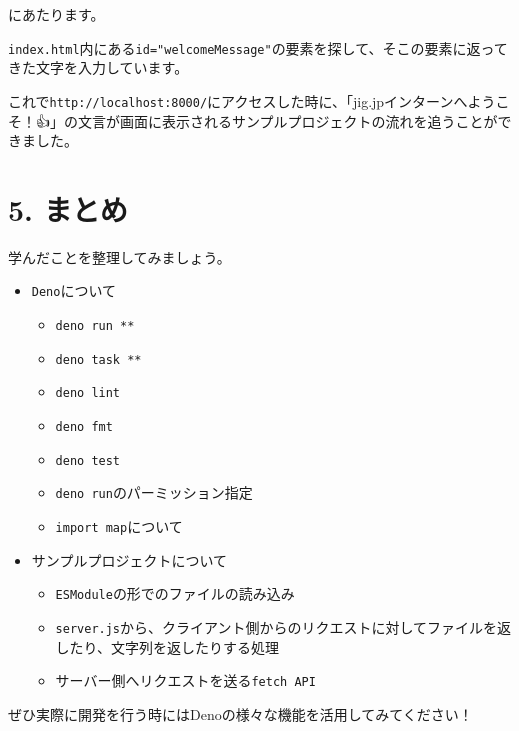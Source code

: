 \begin{Shaded}
\begin{Highlighting}[]
\NormalTok{(}\NormalTok{)} \OperatorTok{=} \NormalTok{()}\OperatorTok{;}
\end{Highlighting}
\end{Shaded}

にあたります。

\texttt{index.html}内にある\texttt{id="welcomeMessage"}の要素を探して、そこの要素に返ってきた文字を入力しています。

これで\texttt{http://localhost:8000/}にアクセスした時に、「jig.jpインターンへようこそ！👍」の文言が画面に表示されるサンプルプロジェクトの流れを追うことができました。

\section{5. まとめ}\label{ux307eux3068ux3081}

学んだことを整理してみましょう。

\begin{itemize}
\tightlist
\item
  \texttt{Deno}について

  \begin{itemize}
  \tightlist
  \item
    \texttt{deno\ run\ **}
  \item
    \texttt{deno\ task\ **}
  \item
    \texttt{deno\ lint}
  \item
    \texttt{deno\ fmt}
  \item
    \texttt{deno\ test}
  \item
    \texttt{deno\ run}のパーミッション指定
  \item
    \texttt{import\ map}について
  \end{itemize}
\item
  サンプルプロジェクトについて

  \begin{itemize}
  \tightlist
  \item
    \texttt{ESModule}の形でのファイルの読み込み
  \item
    \texttt{server.js}から、クライアント側からのリクエストに対してファイルを返したり、文字列を返したりする処理
  \item
    サーバー側へリクエストを送る\texttt{fetch\ API}
  \end{itemize}
\end{itemize}

ぜひ実際に開発を行う時にはDenoの様々な機能を活用してみてください！
